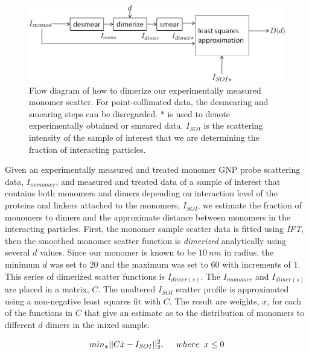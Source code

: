 \documentclass[10pt]{article}%
\begin{document}
\begin{figure}
\centering
\includegraphics[scale=.5]{images/flowdiagramlevel2.png}
\caption{Flow diagram of how to dimerize our experimentally measured monomer scatter. For point-collimated data, the desmearing and smearing steps can be disregarded. $*$ is used to denote experimentally obtained or smeared data. $I_{SOI}$ is the scattering intensity of the sample of interest that we are determining the fraction of interacting particles.}
\label{dimerflow}
\end{figure}

Given an experimentally measured and treated monomer GNP probe scattering data, $I_{monomer}$, and measured and treated data of a sample of interest that contains both monomers and dimers depending on interaction level of the proteins and linkers attached to the monomers, $I_{SOI}$, we estimate the fraction of monomers to dimers and the approximate distance between monomers in the interacting particles.
First, the monomer sample scatter data is fitted using \textit{IFT}, then the smoothed monomer scatter function is \textit{dimerized} analytically using several $d$ values. Since our monomer is known to be $10~nm$ in radius, the minimum $d$ was set to $20$ and the maximum was set to $60$ with increments of $1$. This series of dimerized scatter functions is $I_{dimer(s)}$. The $I_{monomer}$ and $I_{dimer(s)}$ are placed in a matrix, $C$.  The unaltered $I_{SOI}$ scatter profile is approximated using a non-negative least squares fit with $C$.  The result are weights, $x$, for each of the functions in $C$ that give an estimate as to the distribution of monomers to different $d$ dimers in the mixed sample.

\begin{equation}
min_x ||C\dot x- I_{SOI}||^2_2,\hspace{.5 cm} where \hspace{.2 cm} x \le 0
\end{equation}


% 
{\footnotesize} 
\end{document}
